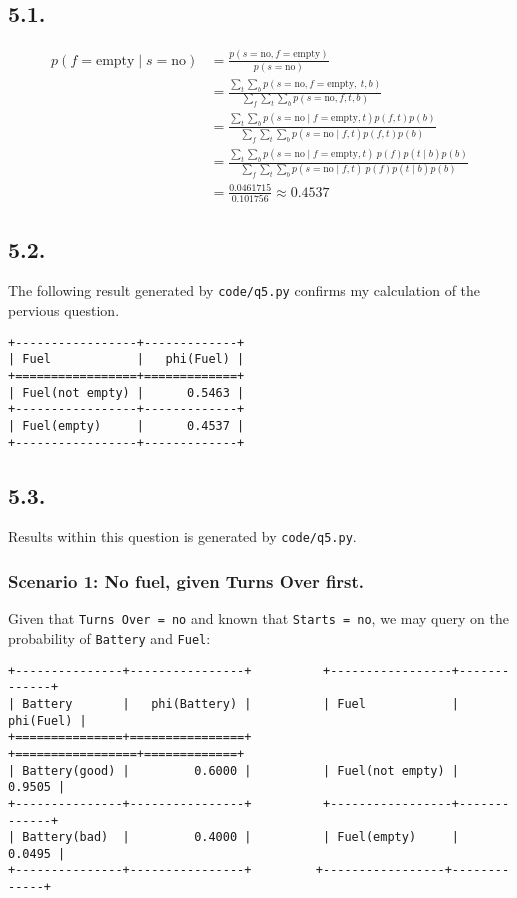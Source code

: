 \documentclass[11pt]{article}
\newcommand{\ilc}{\texttt}
\begin{document}
\subsection*{5.1.}

\begin{align*}
    p(f=\text{empty} \mid s=\text{no}) &= \frac{p(s=\text{no}, f=\text{empty})}{p(s=\text{no})}\\
    &= \frac{\sum_t\sum_b p(s=\text{no}, f=\text{empty}, \ t, b)}{\sum_f\sum_t\sum_b p(s=\text{no},f,t,b)}\\
    &= \frac{\sum_t\sum_b p(s=\text{no} \mid f=\text{empty},t)p(f, t)p(b)}{\sum_f\sum_t\sum_b p(s=\text{no} \mid f,t)p(f, t)p(b)}\\
    &= \frac{\sum_t\sum_b p(s=\text{no} \mid f=\text{empty},t) \ p(f)p(t \mid b)p(b)}{\sum_f\sum_t\sum_b p(s=\text{no} \mid f,t) \ p(f)p(t \mid b)p(b)}\\
    &= \frac{0.0461715}{0.101756} \approx 0.4537
\end{align*}


\subsection*{5.2.}

The following result generated by \ilc{code/q5.py} confirms my calculation of the pervious question.

\begin{lstlisting}
+-----------------+-------------+
| Fuel            |   phi(Fuel) |
+=================+=============+
| Fuel(not empty) |      0.5463 |
+-----------------+-------------+
| Fuel(empty)     |      0.4537 |
+-----------------+-------------+
\end{lstlisting}


\subsection*{5.3.}

Results within this question is generated by \ilc{code/q5.py}.

\subsubsection*{Scenario 1: No fuel, given Turns Over first.}

Given that \ilc{Turns Over = no} and known that \ilc{Starts = no}, we may query on the probability of \ilc{Battery} and \ilc{Fuel}:

\begin{lstlisting}
+---------------+----------------+          +-----------------+-------------+
| Battery       |   phi(Battery) |          | Fuel            |   phi(Fuel) |
+===============+================+          +=================+=============+
| Battery(good) |         0.6000 |          | Fuel(not empty) |      0.9505 |
+---------------+----------------+          +-----------------+-------------+
| Battery(bad)  |         0.4000 |          | Fuel(empty)     |      0.0495 |
+---------------+----------------+         +-----------------+-------------+
\end{lstlisting}
\end{document}

